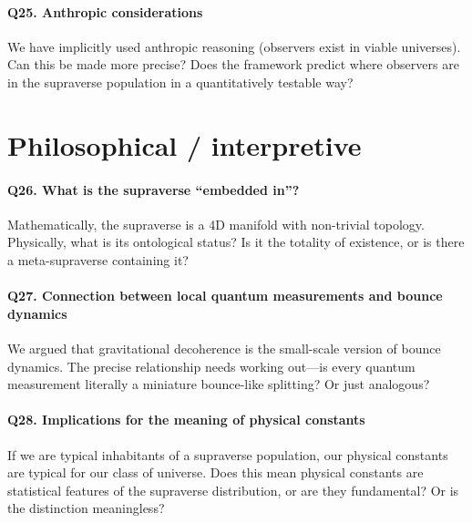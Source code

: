 \paragraph{Q25. Anthropic considerations}
We have implicitly used anthropic reasoning (observers exist in viable
universes). Can this be made more precise? Does the framework predict where
observers are in the supraverse population in a quantitatively testable way?

\section{Philosophical / interpretive}

\paragraph{Q26. What is the supraverse ``embedded in''?}
Mathematically, the supraverse is a 4D manifold with non-trivial topology.
Physically, what is its ontological status? Is it the totality of existence, or
is there a meta-supraverse containing it?

\paragraph{Q27. Connection between local quantum measurements and bounce
  dynamics}
We argued that gravitational decoherence is the small-scale version of bounce
dynamics. The precise relationship needs working out---is every quantum
measurement literally a miniature bounce-like splitting? Or just analogous?

\paragraph{Q28. Implications for the meaning of physical constants}
If we are typical inhabitants of a supraverse population, our physical constants
are typical for our class of universe. Does this mean physical constants are
statistical features of the supraverse distribution, or are they fundamental? Or
is the distinction meaningless?

